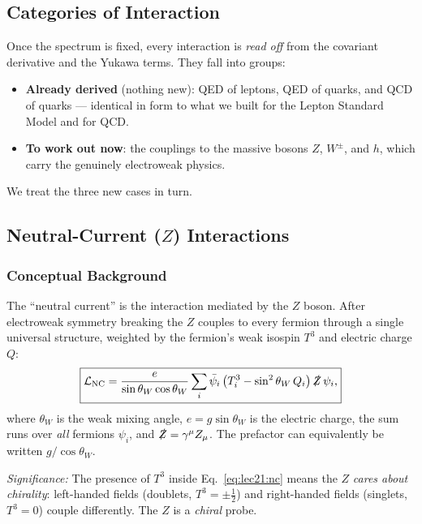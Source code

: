 \subsection{Categories of Interaction}\label{subsec:lec21:categories}

Once the spectrum is fixed, every interaction is \emph{read off} from
the covariant derivative and the Yukawa terms. They fall into groups:
\begin{itemize}
  \item \textbf{Already derived} (nothing new): QED of leptons, QED of
        quarks, and QCD of quarks --- identical in form to what we built
        for the Lepton Standard Model and for QCD.
  \item \textbf{To work out now}: the couplings to the massive bosons
        $Z$, $W^\pm$, and $h$, which carry the genuinely electroweak
        physics.
\end{itemize}
We treat the three new cases in turn.

\subsection{Neutral-Current (\texorpdfstring{$Z$}{Z}) Interactions}\label{subsec:lec21:nc}

\subsubsection*{Conceptual Background}

The ``neutral current'' is the interaction mediated by the $Z$ boson.
After electroweak symmetry breaking the $Z$ couples to every fermion
through a single universal structure, weighted by the fermion's weak
isospin $T^3$ and electric charge $Q$:
\begin{equation}
  \boxed{
    \mathcal{L}_{\rm NC}
    = \frac{e}{\sin\theta_W\cos\theta_W}
      \sum_i \bar\psi_i
      \left(T^3_i - \sin^2\theta_W\,Q_i\right)
      \slashed{Z}\,\psi_i ,
  }
  \label{eq:lec21:nc}
\end{equation}
where $\theta_W$ is the weak mixing angle, $e=g\sin\theta_W$ is the
electric charge, the sum runs over \emph{all} fermions $\psi_i$, and
$\slashed Z=\gamma^\mu Z_\mu$. The prefactor can equivalently be written
$g/\cos\theta_W$.

\textit{Significance:} The presence of $T^3$ inside
Eq.~\eqref{eq:lec21:nc} means the $Z$ \emph{cares about chirality}:
left-handed fields (doublets, $T^3=\pm\tfrac12$) and right-handed fields
(singlets, $T^3=0$) couple differently. The $Z$ is a \emph{chiral}
probe.

